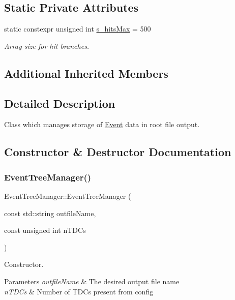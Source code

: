 \subsection*{Static Private Attributes}
\begin{DoxyCompactItemize}
\item 
static constexpr unsigned int \hyperlink{class_event_tree_manager_aab35ad52374d52149bde894c8af7a8c5}{s\+\_\+hits\+Max} = 500
\begin{DoxyCompactList}\small\item\em Array size for hit branches. \end{DoxyCompactList}\end{DoxyCompactItemize}
\subsection*{Additional Inherited Members}


\subsection{Detailed Description}
Class which manages storage of \hyperlink{class_event}{Event} data in root file output. 

\subsection{Constructor \& Destructor Documentation}
\mbox{\label{class_event_tree_manager_ac97238d5991e325f1de2268684889c63}} 
\subsubsection{\texorpdfstring{Event\+Tree\+Manager()}{EventTreeManager()}}
{\footnotesize\ttfamily Event\+Tree\+Manager\+::\+Event\+Tree\+Manager (\begin{DoxyParamCaption}\item[{const std\+::string}]{outfile\+Name,  }\item[{const unsigned int}]{n\+T\+D\+Cs }\end{DoxyParamCaption})}



Constructor. 


\begin{DoxyParams}{Parameters}
{\em outfile\+Name} & The desired output file name \\
\hline
{\em n\+T\+D\+Cs} & Number of T\+D\+Cs present from config \\
\hline
\end{DoxyParams}


